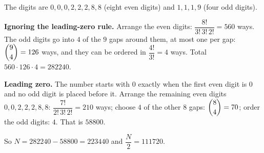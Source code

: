 The digits are $0,0,0,2,2,2,8,8$ (eight even digits) and $1,1,1,9$ (four odd digits).

\textbf{Ignoring the leading-zero rule.} Arrange the even digits: $\dfrac{8!}{3!\,3!\,2!}=560$ ways. The odd digits go into $4$ of the $9$ gaps around them, at most one per gap: $\dbinom94=126$ ways, and they can be ordered in $\dfrac{4!}{3!}=4$ ways. Total $560\cdot126\cdot4=282240$.

\textbf{Leading zero.} The number starts with $0$ exactly when the first even digit is $0$ and no odd digit is placed before it. Arrange the remaining even digits $0,0,2,2,2,8,8$: $\dfrac{7!}{2!\,3!\,2!}=210$ ways; choose $4$ of the other $8$ gaps: $\dbinom84=70$; order the odd digits: $4$. That is $58800$.

So $N=282240-58800=223440$ and $\dfrac {N}{2}=\boxed{111720}$.
